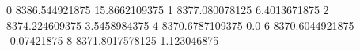 0 8386.544921875 15.8662109375
1 8377.080078125 6.4013671875
2 8374.224609375 3.5458984375
4 8370.6787109375 0.0
6 8370.6044921875 -0.07421875
8 8371.8017578125 1.123046875
